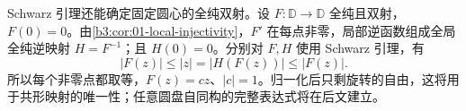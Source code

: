 \ProseParagraphBreak

Schwarz 引理还能确定固定圆心的全纯双射。设 \(F:\mathbb D\to\mathbb D\) 全纯且双射，\(F(0)=0\)。由\cref{b3:cor:01-local-injectivity}，\(F'\) 在每点非零，局部逆函数组成全局全纯逆映射 \(H=F^{-1}\)；且 \(H(0)=0\)。分别对 \(F,H\) 使用 Schwarz 引理，有
\[
 |F(z)|\le|z|=|H(F(z))|\le|F(z)|.
\]
所以每个非零点都取等，\(F(z)=cz\)、\(|c|=1\)。归一化后只剩旋转的自由，这将用于共形映射的唯一性；任意圆盘自同构的完整表达式将在后文建立。
